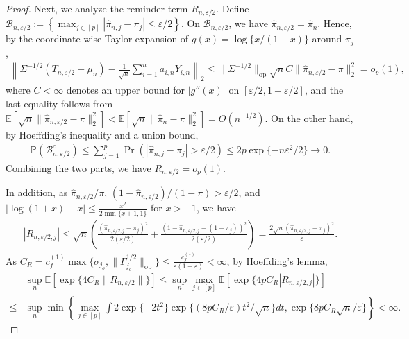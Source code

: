 \documentclass[12pt]{article}
\newcommand{\op}{\mathrm{op}}
\newcommand{\Ee}{{\mathbb{E}}}
\begin{document}
\begin{appendices}
\begin{proof}
Next, we analyze the reminder term $R_{n,\varepsilon/2}$. 
Define $\mathcal B_{n,\varepsilon/2} := \left\{\max_{j\in[p]}|\widehat\pi_{n,j}-\pi_j|\le \varepsilon/2
    \right\}$.
On $\mathcal B_{n,\varepsilon/2}$, we have
$\widehat\pi_{n,\varepsilon/2}=\widehat\pi_n$. Hence, by the coordinate-wise Taylor expansion of
$g(x)=\log\{x/(1-x)\}$ around $\pi_j$,
\begin{align*}
    \left\|
    \Sigma^{-1/2}(T_{n,\varepsilon/2}-\mu_n)
    -
    \frac{1}{\sqrt n}\sum_{i=1}^n a_{i,n}Y_{i,n}
    \right\|_2
    \le
    \|\Sigma^{-1/2}\|_{\op}\sqrt n  C
    \|\widehat\pi_{n,\varepsilon/2}-\pi\|_2^2  
    = o_p(1),
\end{align*}
where $C<\infty$ denotes an upper bound for $|g''(x)|$ on
$[\varepsilon/2,1-\varepsilon/2]$, and the last equality follows from
$\Ee[\sqrt n\|\widehat\pi_{n,\varepsilon/2}-\pi\|_2^2] < \Ee[\sqrt n\|\widehat\pi_{n}-\pi\|_2^2]=O(n^{-1/2})$.
On the other hand, by Hoeffding's inequality and a union bound,
\begin{align*}
\mathbb{P}(\mathcal B_{n,\varepsilon/2}^c) \le
    \sum_{j=1}^p
    \Pr\left(
        |\widehat\pi_{n,j}-\pi_j|>\varepsilon/2
    \right) \le
    2p\exp\{-n\varepsilon^2/2\}
    \to 0.
\end{align*}
Combining the two parts, we have $ R_{n,\varepsilon/2}=o_p(1)$.


In addition, as $\widehat\pi_{n,\varepsilon/2}/\pi$, $(1-\widehat\pi_{n,\varepsilon/2})/(1-\pi)>\varepsilon/2$, and $|\log(1+x) - x | \le \frac{x^2}{2 \min\{x+1,1\}}$ for $x > -1$, we have
\begin{align*}
    |R_{n, \varepsilon/2,j}| \le \sqrt{n} \left(\frac{(\widehat{\pi}_{n,\varepsilon/2,j} - \pi_j)^2}{2(\varepsilon/2)} + \frac{(1-\widehat{\pi}_{n,\varepsilon/2,j} -(1- \pi_j))^2}{2(\varepsilon/2)} \right) = \frac{2\sqrt{n} (\widehat{\pi}_{n,\varepsilon/2,j} - \pi_j)^2}{\varepsilon}.
\end{align*}
As $C_R = c_f^{(1)} \max\{\sigma_{j_o}, \|\Gamma_{j_o}^{1/2}\|_{\text{op}}\} \le \frac{c_f^{(1)}}{\varepsilon (1-\varepsilon)} < \infty$, by Hoeffding's lemma, 
\begin{align*}
    &\sup_n \Ee\!\left[\exp\{4C_R\|R_{n, \varepsilon/2}\|\}\right]
    \le  \sup_n \max_{j \in [p]} \Ee\!\left[\exp\{4pC_R|R_{n, \varepsilon/2,j}|\}\right]\\
    \le&  \sup_n \min\left\{\max_{j \in [p]} \int 2 \exp\{-2t^2\} \exp\{(8pC_R/\varepsilon) t^2 /\sqrt{n} \} dt,\exp\{8pC_R\sqrt{n}/\varepsilon\} \right\}
    <\infty.
\end{align*}


\end{proof}
\end{appendices}
\end{document}
